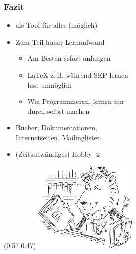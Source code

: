 \documentclass[t,ngerman]{beamer}
\begin{document}



\begin{frame}
  \frametitle{Fazit}
  \begin{itemize}
  \item {} als Tool für alles (möglich)
  \item Zum Teil hoher Lernaufwand\\
    \begin{itemize}
    \item Am Besten sofort anfangen
    \item \LaTeX{} z.\,B. während SEP lernen\\
      fast unmöglich
    \item Wie Programmieren, lernen nur\\
      durch selbst machen
    \end{itemize}
  \item Bücher, Dokumentationen,\\
    Internetseiten, Mailinglisten
  \item (Zeitaufwändiges) Hobby {\Huge ☺}
  \end{itemize}
  \begin{textblock}{5.5}(0.57,0.47)
    \includegraphics[width=5cm]{lion}~
  \end{textblock}
\end{frame}
\end{document}
